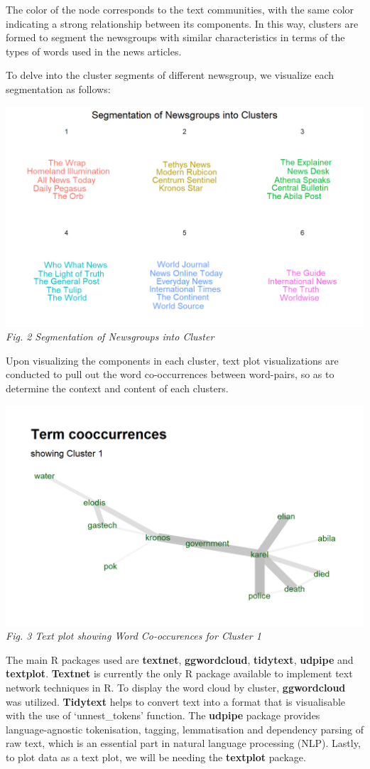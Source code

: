 \documentclass{acm_proc_article-sp}
\begin{document}
The color of the node corresponds to the text communities, with the same
color indicating a strong relationship between its components. In this
way, clusters are formed to segment the newsgroups with similar
characteristics in terms of the types of words used in the news
articles.

To delve into the cluster segments of different newsgroup, we visualize
each segmentation as follows:

\includegraphics{img/image04.png} \emph{Fig. 2 Segmentation of
Newsgroups into Cluster}

Upon visualizing the components in each cluster, text plot
visualizations are conducted to pull out the word co-occurrences between
word-pairs, so as to determine the context and content of each clusters.

\includegraphics{img/image05.png} \emph{Fig. 3 Text plot showing Word
Co-occurences for Cluster 1}

The main R packages used are \textbf{textnet}, \textbf{ggwordcloud},
\textbf{tidytext}, \textbf{udpipe} and \textbf{textplot}.
\textbf{Textnet} is currently the only R package available to implement
text network techniques in R. To display the word cloud by cluster,
\textbf{ggwordcloud} was utilized. \textbf{Tidytext} helps to convert
text into a format that is visualisable with the use of `unnest\_tokens'
function. The \textbf{udpipe} package provides language-agnostic
tokenisation, tagging, lemmatisation and dependency parsing of raw text,
which is an essential part in natural language processing (NLP). Lastly,
to plot data as a text plot, we will be needing the \textbf{textplot}
package.
\end{document}
